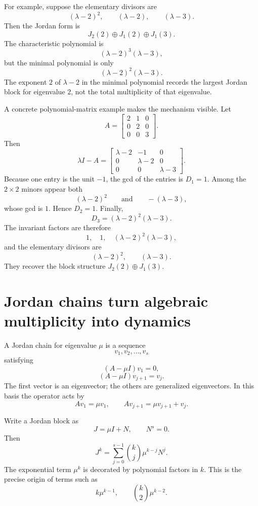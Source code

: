 For example, suppose the elementary divisors are
\[
  (\lambda-2)^2,
  \qquad
  (\lambda-2),
  \qquad
  (\lambda-3).
\]
Then the Jordan form is
\[
  J_2(2)\oplus J_1(2)\oplus J_1(3).
\]
The characteristic polynomial is
\[
  (\lambda-2)^3(\lambda-3),
\]
but the minimal polynomial is only
\[
  (\lambda-2)^2(\lambda-3).
\]
The exponent \(2\) of \(\lambda-2\) in the minimal polynomial records the largest Jordan block for eigenvalue \(2\), not the total multiplicity of that eigenvalue.

A concrete polynomial-matrix example makes the mechanism visible.  Let
\[
  A=
  \begin{bmatrix}
    2&1&0\\
    0&2&0\\
    0&0&3
  \end{bmatrix}.
\]
Then
\[
  \lambda I-A=
  \begin{bmatrix}
    \lambda-2&-1&0\\
    0&\lambda-2&0\\
    0&0&\lambda-3
  \end{bmatrix}.
\]
Because one entry is the unit \(-1\), the gcd of the entries is \(D_1=1\).  Among the \(2\times2\) minors appear both
\[
  (\lambda-2)^2
  \qquad\text{and}\qquad
  -(\lambda-3),
\]
whose gcd is \(1\).  Hence \(D_2=1\).  Finally,
\[
  D_3=(\lambda-2)^2(\lambda-3).
\]
The invariant factors are therefore
\[
  1,\quad1,\quad(\lambda-2)^2(\lambda-3),
\]
and the elementary divisors are
\[
  (\lambda-2)^2,\qquad(\lambda-3).
\]
They recover the block structure \(J_2(2)\oplus J_1(3)\).

\section{Jordan chains turn algebraic multiplicity into dynamics}

A Jordan chain for eigenvalue \(\mu\) is a sequence
\[
  v_1,v_2,\ldots,v_s
\]
satisfying
\[
  (A-\mu I)v_1=0,
\]
\[
  (A-\mu I)v_{j+1}=v_j.
\]
The first vector is an eigenvector; the others are generalized eigenvectors.  In this basis the operator acts by
\[
  Av_1=\mu v_1,
  \qquad
  Av_{j+1}=\mu v_{j+1}+v_j.
\]

Write a Jordan block as
\[
  J=\mu I+N,
  \qquad N^s=0.
\]
Then
\[
  J^k
  =\sum_{j=0}^{s-1}
  \binom{k}{j}\mu^{k-j}N^j.
\]
The exponential term \(\mu^k\) is decorated by polynomial factors in \(k\).  This is the precise origin of terms such as
\[
  k\mu^{k-1},
  \qquad
  \binom{k}{2}\mu^{k-2}.
\]

